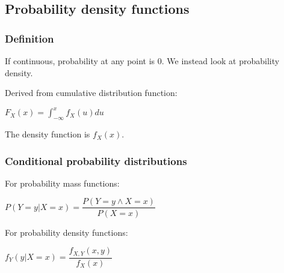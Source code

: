 
\subsection{Probability density functions}

\subsubsection{Definition}

If continuous, probability at any point is \(0\). We instead look at probability density.

Derived from cumulative distribution function:

\(F_X(x)=\int_{-\infty}^x f_X(u)du\)

The density function is \(f_X(x)\).

\subsubsection{Conditional probability distributions}

For probability mass functions:

\(P(Y=y|X=x)=\dfrac{P(Y=y\land X=x)}{P(X=x)}\)

For probability density functions:

\(f_Y(y|X=x)=\dfrac{f_{X,Y}(x,y)}{f_X(x)}\)

